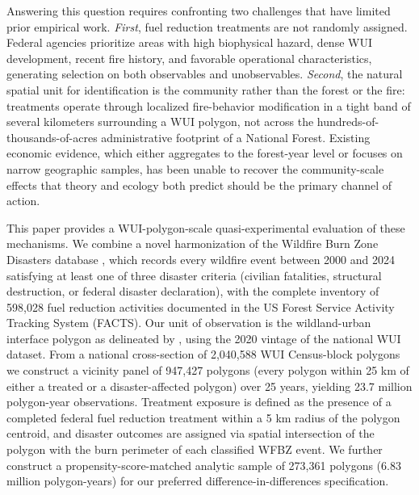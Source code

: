 \documentclass[12pt, letterpaper]{article}
\begin{document}
Answering this question requires confronting two challenges that have limited prior empirical work. \textit{First}, fuel reduction treatments are not randomly assigned. Federal agencies prioritize areas with high biophysical hazard, dense WUI development, recent fire history, and favorable operational characteristics, generating selection on both observables and unobservables. \textit{Second}, the natural spatial unit for identification is the community rather than the forest or the fire: treatments operate through localized fire-behavior modification in a tight band of several kilometers surrounding a WUI polygon, not across the hundreds-of-thousands-of-acres administrative footprint of a National Forest. Existing economic evidence, which either aggregates to the forest-year level \citep{baylis2023} or focuses on narrow geographic samples, has been unable to recover the community-scale effects that theory and ecology both predict should be the primary channel of action.

This paper provides a WUI-polygon-scale quasi-experimental evaluation of these mechanisms. We combine a novel harmonization of the Wildfire Burn Zone Disasters database \citep{wilner2025}, which records every wildfire event between 2000 and 2024 satisfying at least one of three disaster criteria (civilian fatalities, structural destruction, or federal disaster declaration), with the complete inventory of 598,028 fuel reduction activities documented in the US Forest Service Activity Tracking System (FACTS). Our unit of observation is the wildland-urban interface polygon as delineated by \citet{radeloff2018}, using the 2020 vintage of the national WUI dataset. From a national cross-section of 2,040,588 WUI Census-block polygons we construct a vicinity panel of 947,427 polygons (every polygon within 25 km of either a treated or a disaster-affected polygon) over 25 years, yielding 23.7 million polygon-year observations. Treatment exposure is defined as the presence of a completed federal fuel reduction treatment within a 5 km radius of the polygon centroid, and disaster outcomes are assigned via spatial intersection of the polygon with the burn perimeter of each classified WFBZ event. We further construct a propensity-score-matched analytic sample of 273,361 polygons (6.83 million polygon-years) for our preferred difference-in-differences specification.
\end{document}
